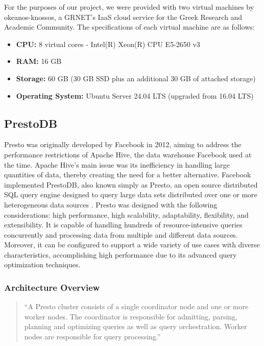 \documentclass[conference]{IEEEtran}
\begin{document}
For the purposes of our project, we were provided with two virtual machines by okeanos-knossos, a GRNET's IaaS cloud service for the Greek Research and Academic Community\cite{b1}.
The specifications of each virtual machine are as follows:

\begin{itemize}
    \item \textbf{CPU:} 8 virtual cores - Intel(R) Xeon(R) CPU E5-2650 v3
    \item \textbf{RAM:} 16 GB
    \item \textbf{Storage:} 60 GB (30 GB SSD plus an additional 30 GB of attached storage)
    \item \textbf{Operating System:} Ubuntu Server 24.04 LTS (upgraded from 16.04 LTS)
\end{itemize}

\subsection{PrestoDB}
Presto was originally developed by Facebook in 2012, aiming to address the performance restrictions of Apache Hive, the data warehouse Facebook used at the time. Apache Hive’s main issue was its inefficiency in handling large quantities of data, thereby creating the need for a better alternative. Facebook implemented PrestoDB, also known simply as Presto, an open source distributed SQL query engine designed to query large data sets distributed over one or more heterogeneous data sources \cite{b2,b3}. Presto was designed with the following considerations: high performance, high scalability, adaptability, flexibility, and extensibility. It is capable of handling hundreds of resource-intensive queries concurrently and processing data from multiple and different data sources. Moreover, it can be configured to support a wide variety of use cases with diverse characteristics, accomplishing high performance due to its advanced query optimization techniques.

\subsubsection{Architecture Overview}

\begin{quote}
    ``A Presto cluster consists of a single coordinator node and one or more worker nodes. The coordinator is responsible for admitting, parsing, planning and optimizing queries as well as query orchestration. Worker nodes are responsible for query processing.'' \cite{b3}
\end{quote}
\end{document}
